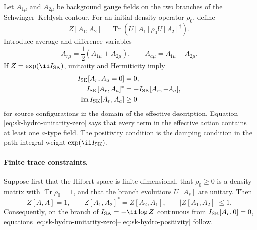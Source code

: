 Let \(A_{1\mu}\) and \(A_{2\mu}\) be background gauge fields on the two
branches of the Schwinger--Keldysh contour.  For an initial density operator
\(\rho_0\), define
\begin{equation}
  Z[A_1,A_2]
  =
  \operatorname{Tr}\!\left(
  U[A_1]\rho_0U[A_2]^\dagger
  \right).
  \label{eq:sk-hydro-generating-functional}
\end{equation}
Introduce average and difference variables
\begin{equation}
  A_{r\mu}=\frac12(A_{1\mu}+A_{2\mu}),
  \qquad
  A_{a\mu}=A_{1\mu}-A_{2\mu}.
  \label{eq:sk-hydro-ra-sources}
\end{equation}
If \(Z=\exp(\ii I_{\rm SK})\), unitarity and Hermiticity imply
\begin{align}
  I_{\rm SK}[A_r,A_a=0]&=0,
  \label{eq:sk-hydro-unitarity-zero}\\
  I_{\rm SK}[A_r,A_a]^*
  &=
  -I_{\rm SK}[A_r,-A_a],
  \label{eq:sk-hydro-reality}\\
  \operatorname{Im} I_{\rm SK}[A_r,A_a]&\ge0
  \label{eq:sk-hydro-positivity}
\end{align}
for source configurations in the domain of the effective description.
Equation \eqref{eq:sk-hydro-unitarity-zero} says that every term in the
effective action contains at least one \(a\)-type field.  The positivity
condition is the damping condition in the path-integral weight
\(\exp(\ii I_{\rm SK})\).

\paragraph{Finite trace constraints.}
Suppose first that the Hilbert space is finite-dimensional, that
\(\rho_0\ge0\) is a density matrix with \(\operatorname{Tr}\rho_0=1\), and
that the branch evolutions \(U[A_s]\) are unitary.  Then
\begin{equation}
  Z[A,A]=1,\qquad
  Z[A_1,A_2]^*=Z[A_2,A_1],\qquad
  |Z[A_1,A_2]|\le1 .
  \label{eq:finite-ctp-constraints}
\end{equation}
Consequently, on the branch of \(I_{\rm SK}=-\ii\log Z\) continuous from
\(I_{\rm SK}[A_r,0]=0\), equations
\eqref{eq:sk-hydro-unitarity-zero}--\eqref{eq:sk-hydro-positivity} follow.

